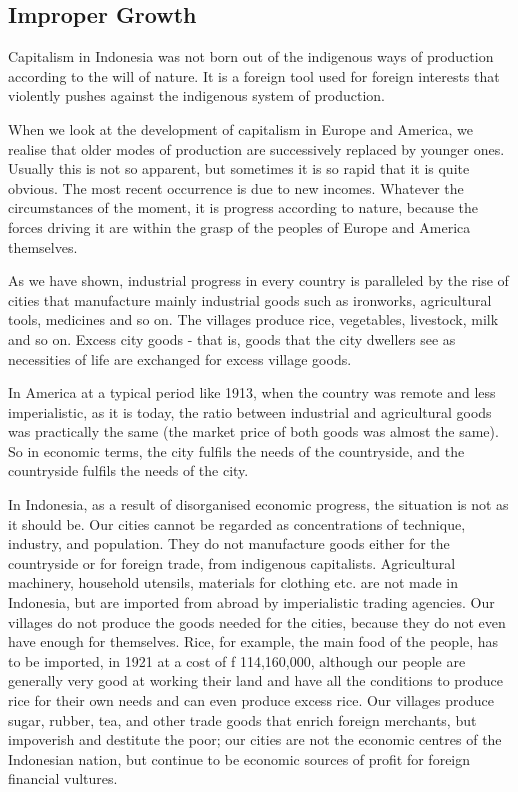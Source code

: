 \subsection{Improper Growth}

Capitalism in Indonesia was not born out of the indigenous ways of production 
according to the will of nature. It is a foreign tool used for foreign interests 
that violently pushes against the indigenous system of production.\nline

When we look at the development of capitalism in Europe and America, 
we realise that older modes of production are successively replaced by 
younger ones. Usually this is not so apparent, but sometimes it is so 
rapid that it is quite obvious. The most recent occurrence is due to new incomes. 
Whatever the circumstances of the moment, it is progress according to nature, because 
the forces driving it are within the grasp of the peoples of Europe and America themselves.\nline

As we have shown, industrial progress in every country is paralleled by the 
rise of cities that manufacture mainly industrial goods such as ironworks, 
agricultural tools, medicines and so on. The villages produce rice, vegetables, 
livestock, milk and so on. Excess city goods - that is, goods that the city dwellers 
see as necessities of life are exchanged for excess village goods.\nline

In America at a typical period like 1913, when the country was remote and less 
imperialistic, as it is today, the ratio between industrial and agricultural goods 
was practically the same (the market price of both goods was almost the same). 
So in economic terms, the city fulfils the needs of the countryside, and the countryside fulfils the needs of the city.\nline

In Indonesia, as a result of disorganised economic progress, the situation is not as it should be. 
Our cities cannot be regarded as concentrations of technique, industry, and population. 
They do not manufacture goods either for the countryside or for foreign trade, from indigenous capitalists. 
Agricultural machinery, household utensils, materials for clothing etc. are not made in Indonesia, 
but are imported from abroad by imperialistic trading agencies. Our villages do not produce the goods 
needed for the cities, because they do not even have enough for themselves. Rice, for example, the main 
food of the people, has to be imported, in 1921 at a cost of f 114,160,000, although our people are 
generally very good at working their land and have all the conditions to produce rice for their own needs 
and can even produce excess rice. Our villages produce sugar, rubber, tea, and other trade goods that enrich 
foreign merchants, but impoverish and destitute the poor; our cities are not the economic centres of the 
Indonesian nation, but continue to be economic sources of profit for foreign financial vultures.\nline

